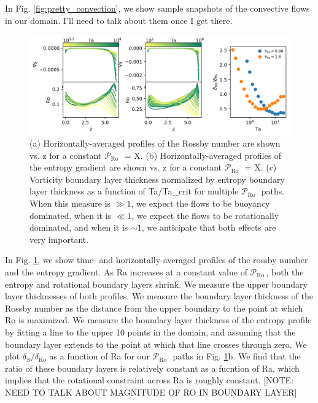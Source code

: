 \documentclass[twocolumn, amsmath, amsfonts, amssymb]{aastex62}
\newcommand{\pro}{\ensuremath{\mathcal{P}_{\text{Ro}}\,}}
\begin{document}
In Fig. \ref{fig:pretty_convection}, we show sample snapshots of the convective flows in
our domain. I'll need to talk about them once I get there.

\begin{figure}[h]
\includegraphics[width=\textwidth]{./figs/boundary_layers.png}
\caption{(a) Horizontally-averaged profiles of the Rossby number are shown
vs. z for a constant \pro$\,$ = X. (b) Horizontally-averaged profiles of 
the entropy gradient are shown vs. z for a constant \pro$\,$ = X.
(c) Vorticity boundary layer thickness normalized by entropy boundary layer
thickness as a function of Ta/Ta\_crit for multiple \pro$\,$ paths.
When this measure is $\gg 1$, we expect the flows to be buoyancy dominated,
when it is $\ll 1$, we expect the flows to be rotationally dominated,
and when it is $\sim 1$, we anticipate that both effects are very important.
\label{fig:profiles_and_bls} }
\end{figure}

In Fig. \ref{fig:profiles_and_bls}, we show time- and horizontally-averaged profiles of
the rossby number and the entropy gradient. As Ra increases at a constant value of
\pro, both the entropy and rotational boundary layers shrink. We measure the
upper boundary layer thicknesses of both profiles. We measure the boundary layer thickness
of the Rossby number as the distance from the upper boundary to the point at which Ro
is maximized. We measure the boundary layer thickness of the entropy profile by fitting
a line to the upper 10 points in the domain, and assuming that the boundary layer extends to
the point at which that line crosses through zero. We plot $\delta_S/\delta_{\text{Ro}}$
as a function of Ra for our \pro$\,$ paths in Fig. \ref{fig:profiles_and_bls}b. We find
that the ratio of these boundary layers is relatively constant as a fucntion of Ra, which
implies that the rotational constraint across Ra is roughly constant.
[NOTE: NEED TO TALK ABOUT MAGNITUDE OF RO IN BOUNDARY LAYER]
\end{document}
